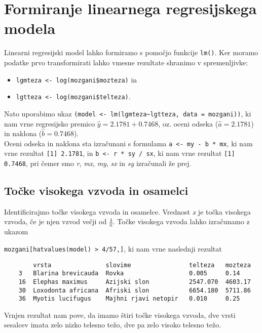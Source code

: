 \section{Formiranje linearnega regresijskega modela}

Linearni regresijski model lahko formiramo s pomočjo funkcije \verb|lm()|.
Ker moramo podatke prvo transformirati lahko vmesne rezultate shranimo v spremenljivke:

\begin{itemize}
    \item \verb|lgmteza <- log(mozgani$mozteza)| in
    \item \verb|lgtteza <- log(mozgani$telteza)|.
\end{itemize}

\noindent
Nato uporabimo ukaz \verb|(model <- lm(lgmteza~lgtteza, data = mozgani))|, ki nam vrne regresijsko premico
$\widehat{y} = 2.1781 + 0.7468$, oz. oceni odseka ($\widehat{a} = 2.1781$) in naklona ($\widehat{b} = 0.7468$).\\

\noindent
Oceni odseka in naklona sta izračunani s formulama \verb|a <- my - b * mx|, ki nam vrne rezultat \verb|[1] 2.1781|,
in \verb|b <- r * sy / sx|, ki nam vrne rezultat \verb|[1] 0.7468|, pri čemer smo \emph{r}, \emph{mx}, \emph{my},
\emph{sx} in \emph{sy} izračunali že prej.

\subsection{Točke visokega vzvoda in osamelci}

Identificirajmo točke visokega vzvoda in osamelce.
Vrednost \emph{x} je točka visokega vzvoda, če je njen vzvod večji od $\frac{4}{n}$.
Točke visokega vzvoda lahko izračunamo z ukazom

\verb|mozgani[hatvalues(model) > 4/57,]|, ki nam vrne naslednji rezultat

\begin{verbatim}
        vrsta               slovime                telteza   mozteza
    3   Blarina brevicauda  Rovka                  0.005     0.14
    16  Elephas maximus     Azijski slon           2547.070  4603.17
    30  Loxodonta africana  Afriski slon           6654.180  5711.86
    36  Myotis lucifugus    Majhni rjavi netopir   0.010     0.25
\end{verbatim}

Vrnjen rezultat nam pove, da imamo štiri točke visokega vzvoda, dve vrsti sesalcev imata zelo nizko telesno težo,
dve pa zelo visoko telesno težo.\\

